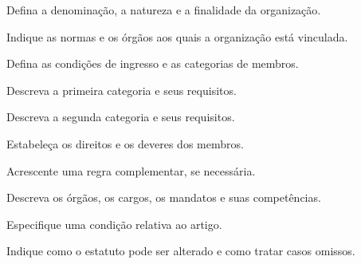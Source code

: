 \documentclass[
  paper-size=a4,
  font-size=11pt,
  two-sided=true,
  title-page=true,
  inner-margin=22mm,
  outer-margin=22mm,
  top-margin=24mm,
  bottom-margin=28mm,
  color-model=rgb
]{ieeeufgcs}
\begin{document}
\maketitle


\EstatutoArtigo
Defina a denominação, a natureza e a finalidade da organização.

\EstatutoArtigo
Indique as normas e os órgãos aos quais a organização está vinculada.


\EstatutoArtigo
Defina as condições de ingresso e as categorias de membros.

\begin{EstatutoIncisos}
  \item Descreva a primeira categoria e seus requisitos.
  \item Descreva a segunda categoria e seus requisitos.
\end{EstatutoIncisos}

\EstatutoArtigo
Estabeleça os direitos e os deveres dos membros.

\EstatutoParagrafoUnico
Acrescente uma regra complementar, se necessária.


\EstatutoArtigo
Descreva os órgãos, os cargos, os mandatos e suas competências.

\EstatutoParagrafo
Especifique uma condição relativa ao artigo.


\EstatutoArtigo
Indique como o estatuto pode ser alterado e como tratar casos omissos.
\end{document}
